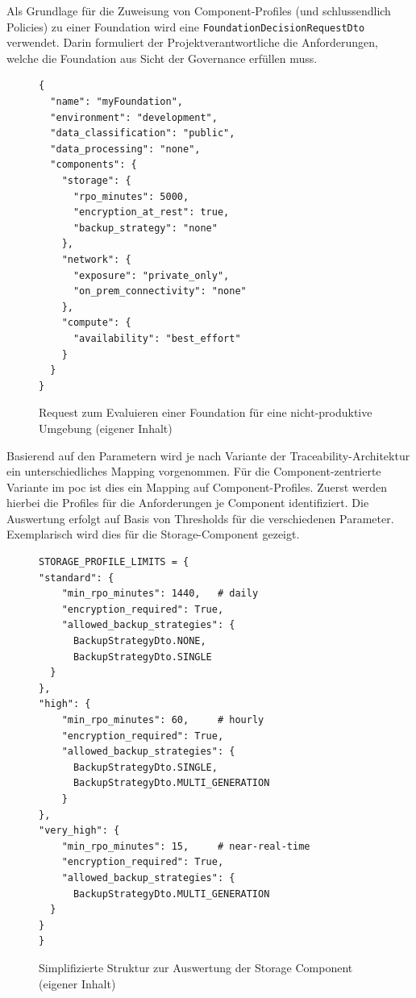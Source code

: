 Als Grundlage für die Zuweisung von Component-Profiles (und schlussendlich Policies) zu einer Foundation wird eine \texttt{FoundationDecisionRequestDto} verwendet. Darin formuliert der Projektverantwortliche die Anforderungen, welche die Foundation aus Sicht der Governance erfüllen muss.

\begin{figure}[H]
\centering
\begin{lstlisting}
{
  "name": "myFoundation",
  "environment": "development",
  "data_classification": "public",
  "data_processing": "none",
  "components": {
    "storage": {
      "rpo_minutes": 5000,
      "encryption_at_rest": true,
      "backup_strategy": "none"
    },
    "network": {
      "exposure": "private_only",
      "on_prem_connectivity": "none"
    },
    "compute": {
      "availability": "best_effort"
    }
  }
}
\end{lstlisting}
\caption{Request zum Evaluieren einer Foundation für eine nicht-produktive Umgebung (eigener Inhalt)}
\label{fig:foundation-decision-request}
\end{figure}

Basierend auf den Parametern wird je nach Variante der Traceability-Architektur ein unterschiedliches Mapping vorgenommen. Für die Component-zentrierte Variante im \ac{poc} ist dies ein Mapping auf Component-Profiles. Zuerst werden hierbei die Profiles für die Anforderungen je Component identifiziert. Die Auswertung erfolgt auf Basis von Thresholds für die verschiedenen Parameter. Exemplarisch wird dies für die Storage-Component gezeigt.

\begin{figure}[H]
\centering
\begin{lstlisting}
STORAGE_PROFILE_LIMITS = {
"standard": {
    "min_rpo_minutes": 1440,   # daily
    "encryption_required": True,
    "allowed_backup_strategies": {
      BackupStrategyDto.NONE,
      BackupStrategyDto.SINGLE
  }
},
"high": {
    "min_rpo_minutes": 60,     # hourly
    "encryption_required": True,
    "allowed_backup_strategies": {
      BackupStrategyDto.SINGLE,
      BackupStrategyDto.MULTI_GENERATION
    }
},
"very_high": {
    "min_rpo_minutes": 15,     # near-real-time
    "encryption_required": True,
    "allowed_backup_strategies": {
      BackupStrategyDto.MULTI_GENERATION
  }
}
}
\end{lstlisting}
\caption{Simplifizierte Struktur zur Auswertung der Storage Component (eigener Inhalt)}
\label{fig:storage-profile-limits}
\end{figure}

